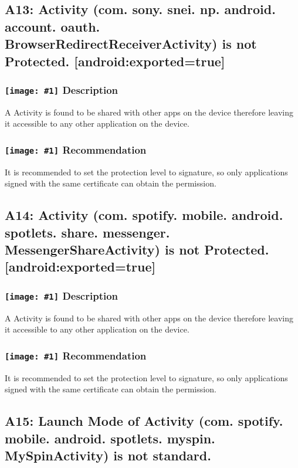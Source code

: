 \documentclass[12p]{article}
\newcommand{\icon}[1]{\texttt{[image: \#1]}}
\begin{document}
\subsection{A13: Activity (com. sony. snei. np. android. account. oauth. BrowserRedirectReceiverActivity) is not Protected. [android:exported=true]}
\subsubsection*{\protect\icon{/home/miki/Documents/GITHUB/AndroidPermissions/python/vulns/report_icons/basic_sheet.png} Description}
A Activity is found to be shared with other apps on the device therefore leaving it accessible to any other application on the device.
\subsubsection*{\protect\icon{/home/miki/Documents/GITHUB/AndroidPermissions/python/vulns/report_icons/basic_todo.png} Recommendation}
It is recommended to set the protection level to signature, so only applications signed with the same certificate can obtain the permission.
\subsection{A14: Activity (com. spotify. mobile. android. spotlets. share. messenger. MessengerShareActivity) is not Protected. [android:exported=true]}
\subsubsection*{\protect\icon{/home/miki/Documents/GITHUB/AndroidPermissions/python/vulns/report_icons/basic_sheet.png} Description}
A Activity is found to be shared with other apps on the device therefore leaving it accessible to any other application on the device.
\subsubsection*{\protect\icon{/home/miki/Documents/GITHUB/AndroidPermissions/python/vulns/report_icons/basic_todo.png} Recommendation}
It is recommended to set the protection level to signature, so only applications signed with the same certificate can obtain the permission.
\subsection{A15: Launch Mode of Activity (com. spotify. mobile. android. spotlets. myspin. MySpinActivity) is not standard.}
\end{document}
